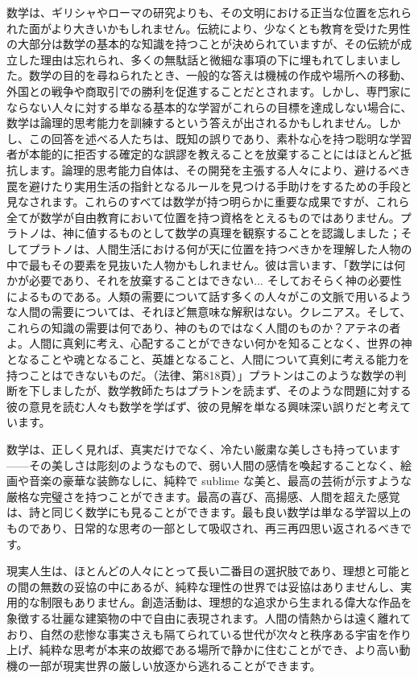\documentclass[a4paper,11pt,openany]{ltjsbook}
\begin{document}
数学は、ギリシャやローマの研究よりも、その文明における正当な位置を忘れられた面がより大きいかもしれません。伝統により、少なくとも教育を受けた男性の大部分は数学の基本的な知識を持つことが決められていますが、その伝統が成立した理由は忘れられ、多くの無駄話と微細な事項の下に埋もれてしまいました。数学の目的を尋ねられたとき、一般的な答えは機械の作成や場所への移動、外国との戦争や商取引での勝利を促進することだとされます。しかし、専門家にならない人々に対する単なる基本的な学習がこれらの目標を達成しない場合に、数学は論理的思考能力を訓練するという答えが出されるかもしれません。しかし、この回答を述べる人たちは、既知の誤りであり、素朴な心を持つ聡明な学習者が本能的に拒否する確定的な誤謬を教えることを放棄することにはほとんど抵抗します。論理的思考能力自体は、その開発を主張する人々により、避けるべき罠を避けたり実用生活の指針となるルールを見つける手助けをするための手段と見なされます。これらのすべては数学が持つ明らかに重要な成果ですが、これら全てが数学が自由教育において位置を持つ資格をとえるものではありません。プラトノは、神に値するものとして数学の真理を観察することを認識しました；そしてプラトノは、人間生活における何が天に位置を持つべきかを理解した人物の中で最もその要素を見抜いた人物かもしれません。彼は言います、「数学には何かが必要であり、それを放棄することはできない... そしておそらく神の必要性によるものである。人類の需要について話す多くの人々がこの文脈で用いるような人間の需要については、それほど無意味な解釈はない。クレニアス。そして、これらの知識の需要は何であり、神のものではなく人間のものか？アテネの者よ。人間に真剣に考え、心配することができない何かを知ることなく、世界の神となることや魂となること、英雄となること、人間について真剣に考える能力を持つことはできないものだ。（法律、第818頁）」プラトンはこのような数学の判断を下しましたが、数学教師たちはプラトンを読まず、そのような問題に対する彼の意見を読む人々も数学を学ばず、彼の見解を単なる興味深い誤りだと考えています。

数学は、正しく見れば、真実だけでなく、冷たい厳粛な美しさも持っています——その美しさは彫刻のようなもので、弱い人間の感情を喚起することなく、絵画や音楽の豪華な装飾なしに、純粋で sublime な美と、最高の芸術が示すような厳格な完璧さを持つことができます。最高の喜び、高揚感、人間を超えた感覚は、詩と同じく数学にも見ることができます。最も良い数学は単なる学習以上のものであり、日常的な思考の一部として吸収され、再三再四思い返されるべきです。

現実人生は、ほとんどの人々にとって長い二番目の選択肢であり、理想と可能との間の無数の妥協の中にあるが、純粋な理性の世界では妥協はありませんし、実用的な制限もありません。創造活動は、理想的な追求から生まれる偉大な作品を象徴する壮麗な建築物の中で自由に表現されます。人間の情熱からは遠く離れており、自然の悲惨な事実さえも隔てられている世代が次々と秩序ある宇宙を作り上げ、純粋な思考が本来の故郷である場所で静かに住むことができ、より高い動機の一部が現実世界の厳しい放逐から逃れることができます。
\end{document}
